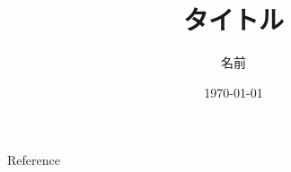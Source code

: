 \documentclass[dvipdfmx,cjk,usepdftitle=false]{beamer}
\theoremstyle{definition}
\theoremstyle{example}
\begin{document}
\title[title]{タイトル}
\author[Name]{名前}%
\date{\today}

\begin{frame}                  %
\titlepage                     %
\end{frame}

\begin{frame}                  %
\tableofcontents
\end{frame}




\begin{frame}[allowframebreaks]{Reference}
\scriptsize
\beamertemplatetextbibitems
%
%

\end{frame}
\end{document}
